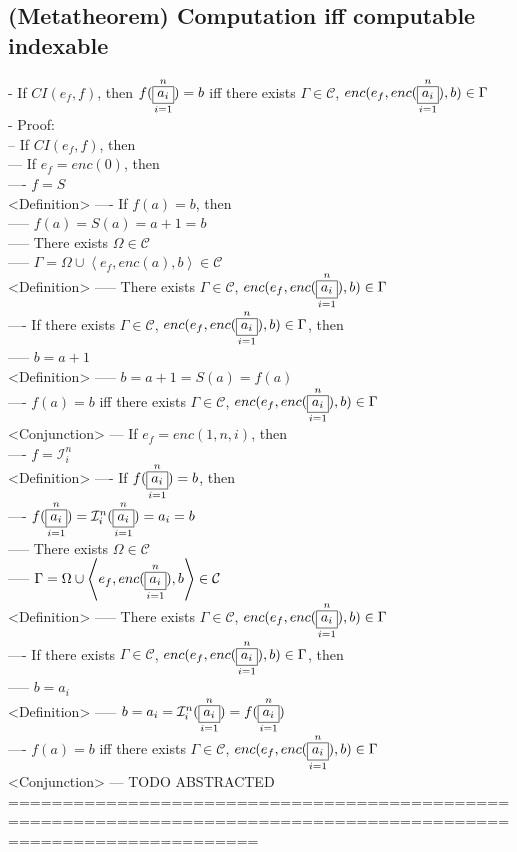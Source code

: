\documentclass{book}
\newcommand{\seq}[1]{\left\langle #1 \right\rangle}
\newcommand{\vdc}[3]{\underset{#2}{\overset{#3}{\fbox{$#1$}}}}
\begin{document}
\subsection{(Metatheorem) Computation iff computable indexable} %
	- If $CI(e_f, f)$, then $f(\vdc{a_i}{i=1}{n}) = b$ iff there exists $\Gamma \in \mathcal{C}$, $enc(e_f, enc(\vdc{a_i}{i=1}{n}), b) \in \Gamma$ \\
	- Proof: \\
		-- If $CI(e_f, f)$, then \\
			--- If $e_f = enc(0)$, then \\	
				---- $f = S$ \\ <Definition>
				---- If $f(a) = b$, then \\
					----- $f(a) = S(a) = a+1 = b$ \\
					----- There exists $\Omega \in \mathcal{C}$ \\
					----- $\Gamma = \Omega \cup \seq{e_f, enc(a), b} \in \mathcal{C}$ \\ <Definition>
					----- There exists $\Gamma \in \mathcal{C}$, $enc(e_f, enc(\vdc{a_i}{i=1}{n}), b) \in \Gamma$ \\
				---- If there exists $\Gamma \in \mathcal{C}$, $enc(e_f, enc(\vdc{a_i}{i=1}{n}), b) \in \Gamma$, then \\
					----- $b = a+1$ \\ <Definition>
					----- $b = a+1 = S(a) = f(a)$ \\
				---- $f(a) = b$ iff there exists $\Gamma \in \mathcal{C}$, $enc(e_f, enc(\vdc{a_i}{i=1}{n}), b) \in \Gamma$ \\ <Conjunction>
			--- If $e_f = enc(1, n, i)$, then \\
				---- $f = \mathcal{I}_i^n$ \\ <Definition>
				---- If $f(\vdc{a_i}{i=1}{n}) = b$, then \\
					---- $f(\vdc{a_i}{i=1}{n}) = \mathcal{I}_i^n(\vdc{a_i}{i=1}{n}) = a_i = b$ \\
					----- There exists $\Omega \in \mathcal{C}$ \\
					----- $\Gamma = \Omega \cup \seq{e_f, enc(\vdc{a_i}{i=1}{n}), b} \in \mathcal{C}$ \\ <Definition>
					----- There exists $\Gamma \in \mathcal{C}$, $enc(e_f, enc(\vdc{a_i}{i=1}{n}), b) \in \Gamma$ \\
				---- If there exists $\Gamma \in \mathcal{C}$, $enc(e_f, enc(\vdc{a_i}{i=1}{n}), b) \in \Gamma$, then \\
					----- $b = a_i$ \\ <Definition>
					----- $b = a_i =  \mathcal{I}_i^n(\vdc{a_i}{i=1}{n}) = f(\vdc{a_i}{i=1}{n})$ \\
				---- $f(a) = b$ iff there exists $\Gamma \in \mathcal{C}$, $enc(e_f, enc(\vdc{a_i}{i=1}{n}), b) \in \Gamma$ \\ <Conjunction>
			--- TODO ABSTRACTED \\
	===================================================================================================================
\end{document}
